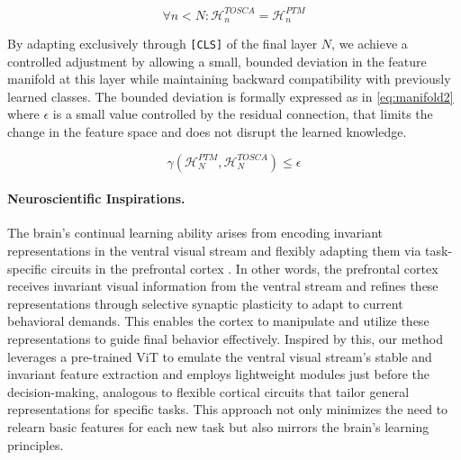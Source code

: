 \begin{equation}
\forall n < N: \mathcal{H}_n^{TOSCA} = \mathcal{H}_n^{PTM}
\label{eq:manifold}
\end{equation}

By adapting exclusively through \texttt{[CLS]} of the final layer $N$, we achieve a controlled adjustment by allowing a small, bounded deviation in the feature manifold at this layer while maintaining backward compatibility with previously learned classes. The bounded deviation is formally expressed as in \cref{eq:manifold2} where $\epsilon$ is a small value controlled by the residual connection, that limits the change in the feature space and does not disrupt the learned knowledge.

\begin{equation}
\gamma(\mathcal{H}_N^{PTM}, \mathcal{H}_N^{TOSCA}) \leq \epsilon
\label{eq:manifold2}
\end{equation}

\paragraph{Neuroscientific Inspirations.}
The brain's continual learning ability arises from encoding invariant representations in the ventral visual stream \cite{ventral,ventral1} and flexibly adapting them via task-specific circuits in the prefrontal cortex \cite{cortex,cortex1, cortex2}. In other words, the prefrontal cortex receives invariant visual information from the ventral stream and refines these representations through selective synaptic plasticity to adapt to current behavioral demands. This enables the cortex to manipulate and utilize these representations to guide final behavior effectively. Inspired by this, our method leverages a pre-trained ViT to emulate the ventral visual stream’s stable and invariant feature extraction and employs lightweight modules just before the decision-making, analogous to flexible cortical circuits that tailor general representations for specific tasks. This approach not only minimizes the need to relearn basic features for each new task but also mirrors the brain’s learning principles.

